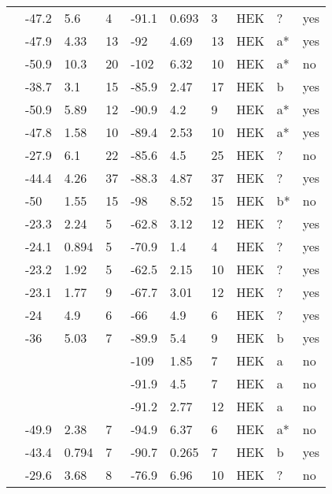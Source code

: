 \begin{longtable}{p{5cm}|lll|lll|lll}
\citet{Mok2003MutationDB} & -47.2 & 5.6 & 4 & -91.1 & 0.693 & 3 & HEK & ? & yes \\
\citet{Moreau2013MutationDB} & -47.9 & 4.33 & 13 & -92 & 4.69 & 13 & HEK & a* & yes \\
\citet{Murphy2012MutationDB} & -50.9 & 10.3 & 20 & -102 & 6.32 & 10 & HEK & a* & no \\
\citet{Nakajima2015MutationDB} & -38.7 & 3.1 & 15 & -85.9 & 2.47 & 17 & HEK & b & yes \\
\citet{Neu2010MutationDB} & -50.9 & 5.89 & 12 & -90.9 & 4.2 & 9 & HEK & a* & yes \\
\citet{Nguyen2008MutationDB} & -47.8 & 1.58 & 10 & -89.4 & 2.53 & 10 & HEK & a* & yes \\
\citet{Olesen2012MutationDB} & -27.9 & 6.1 & 22 & -85.6 & 4.5 & 25 & HEK & ? & no \\
\citet{Otagiri2008MutationDB} & -44.4 & 4.26 & 37 & -88.3 & 4.87 & 37 & HEK & ? & yes \\
\citet{Pfahnl2007MutationDB} & -50 & 1.55 & 15 & -98 & 8.52 & 15 & HEK & b* & no \\
\citet{Rivolta2001MutationDB} & -23.3 & 2.24 & 5 & -62.8 & 3.12 & 12 & HEK & ? & yes \\
\citet{Rossenbacker2004MutationDB} & -24.1 & 0.894 & 5 & -70.9 & 1.4 & 4 & HEK & ? & yes \\
\citet{Ruan2007MutationDB} & -23.2 & 1.92 & 5 & -62.5 & 2.15 & 10 & HEK & ? & yes \\
\citet{Ruan2010MutationDB} & -23.1 & 1.77 & 9 & -67.7 & 3.01 & 12 & HEK & ? & yes \\
\citet{Saber2015MutationDB} & -24 & 4.9 & 6 & -66 & 4.9 & 6 & HEK & ? & yes \\
\citet{Samani2009MutationDB} & -36 & 5.03 & 7 & -89.9 & 5.4 & 9 & HEK & b & yes \\
\citet{Sarhan2009MutationDB} & && & -109 & 1.85 & 7 & HEK & a & no \\
\citet{Shinlapawittayatorn2011aMutationDB} & && & -91.9 & 4.5 & 7 & HEK & a & no \\
\citet{Shinlapawittayatorn2011bMutationDB} & && & -91.2 & 2.77 & 12 & HEK & a & no \\
\citet{Shirai2002MutationDB} & -49.9 & 2.38 & 7 & -94.9 & 6.37 & 6 & HEK & a* & no \\
\citet{Shuraih2007MutationDB} & -43.4 & 0.794 & 7 & -90.7 & 0.265 & 7 & HEK & b & yes \\
\citet{Shy2014MutationDB} & -29.6 & 3.68 & 8 & -76.9 & 6.96 & 10 & HEK & ? & no \\

\end{longtable}
